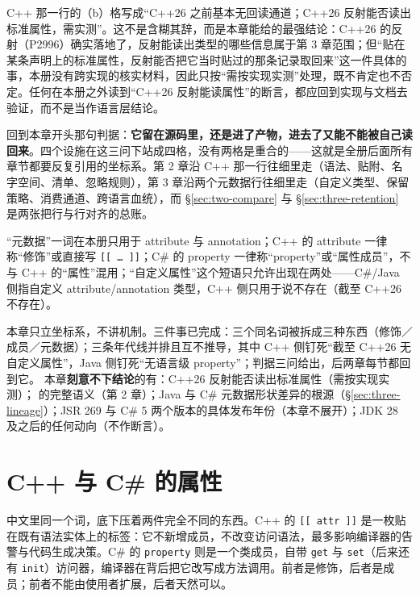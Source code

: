 \documentclass[12pt,a4paper,fontset=fandol]{ctexbook}
\newcommand{\cpp}[1]{C++#1}
\newcommand{\kw}[1]{\texttt{#1}}
\newcommand{\seqkw}[1]{\seqsplit{\texttt{#1}}}
\begin{document}
\begin{note}[title={怎么读表里那句“需实测”}]
\cpp{} 那一行的（b）格写成“\cpp{26} 之前基本无回读通道；\cpp{26} 反射能否读出标准属性，需实测”。这不是含糊其辞，而是本章能给的最强结论：\cpp{26} 的反射（P2996）确实落地了，反射能读出类型的哪些信息属于第 3 章范围；但“贴在某条声明上的标准属性，反射能否把它当时贴过的那条记录取回来”这一件具体的事，本册没有跨实现的核实材料，因此只按“需按实现实测”处理，既不肯定也不否定。任何在本册之外读到“\cpp{26} 反射能读属性”的断言，都应回到实现与文档去验证，而不是当作语言层结论。
\end{note}

回到本章开头那句判据：\textbf{它留在源码里，还是进了产物，进去了又能不能被自己读回来}。四个设施在这三问下站成四格，没有两格是重合的——这就是全册后面所有章节都要反复引用的坐标系。第 2 章沿 \cpp{} 那一行往细里走（语法、贴附、名字空间、清单、忽略规则），第 3 章沿两个元数据行往细里走（自定义类型、保留策略、消费通道、跨语言血统），而 \S\ref{sec:two-compare} 与 \S\ref{sec:three-retention} 是两张把行与行对齐的总账。

\begin{note}[title={本册的用词约定}]
“元数据”一词在本册只用于 attribute 与 annotation；\cpp{} 的 attribute 一律称“修饰”或直接写 \texttt{[[\,\dots\,]]}；C\# 的 property 一律称“property”或“属性成员”，不与 \cpp{} 的“属性”混用；“自定义属性”这个短语只允许出现在两处——C\#/Java 侧指自定义 attribute/annotation 类型，\cpp{} 侧只用于说不存在（截至 \cpp{26} 不存在）。
\end{note}

\begin{guideline}[title={本章的定位与本章不下结论的清单}]
本章只立坐标系，不讲机制。三件事已完成：三个同名词被拆成三种东西（修饰／成员／元数据）；三条年代线并排且互不推导，其中 \cpp{} 侧钉死“截至 \cpp{26} 无自定义属性”，Java 侧钉死“无语言级 property”；判据三问给出，后两章每节都回到它。
本章\textbf{刻意不下结论}的有：\cpp{26} 反射能否读出标准属性（需按实现实测）；\seqkw{\_\_declspec(property)} 的完整语义（第 2 章）；Java 与 C\# 元数据形状差异的根源（\S\ref{sec:three-lineage}）；JSR 269 与 C\# 5 两个版本的具体发布年份（本章不展开）；JDK 28 及之后的任何动向（不作断言）。
\end{guideline}

\chapter{C++ 与 C\# 的属性}
\label{ch:two}

中文里同一个词，底下压着两件完全不同的东西。C++ 的 \texttt{[[\,attr\,]]} 是一枚贴在既有语法实体上的标签：它不新增成员，不改变访问语法，最多影响编译器的告警与代码生成决策。C\# 的 \kw{property} 则是一个类成员，自带 \kw{get} 与 \kw{set}（后来还有 \kw{init}）访问器，编译器在背后把它改写成方法调用。前者是修饰，后者是成员；前者不能由使用者扩展，后者天然可以。
\end{document}
